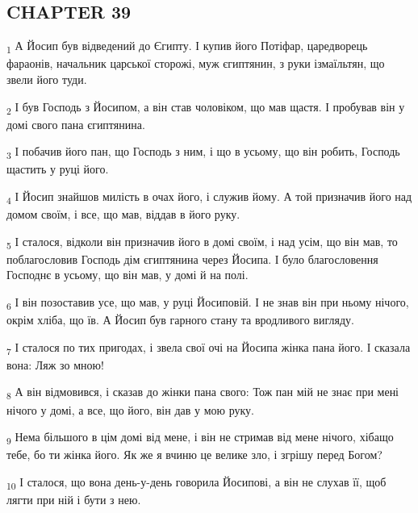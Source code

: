 \subsection{CHAPTER 39}
\begin{tcolorbox}
\textsubscript{1} А Йосип був відведений до Єгипту. І купив його Потіфар, царедворець фараонів, начальник царської сторожі, муж єгиптянин, з руки ізмаїльтян, що звели його туди.
\end{tcolorbox}
\begin{tcolorbox}
\textsubscript{2} І був Господь з Йосипом, а він став чоловіком, що мав щастя. І пробував він у домі свого пана єгиптянина.
\end{tcolorbox}
\begin{tcolorbox}
\textsubscript{3} І побачив його пан, що Господь з ним, і що в усьому, що він робить, Господь щастить у руці його.
\end{tcolorbox}
\begin{tcolorbox}
\textsubscript{4} І Йосип знайшов милість в очах його, і служив йому. А той призначив його над домом своїм, і все, що мав, віддав в його руку.
\end{tcolorbox}
\begin{tcolorbox}
\textsubscript{5} І сталося, відколи він призначив його в домі своїм, і над усім, що він мав, то поблагословив Господь дім єгиптянина через Йосипа. І було благословення Господнє в усьому, що він мав, у домі й на полі.
\end{tcolorbox}
\begin{tcolorbox}
\textsubscript{6} І він позоставив усе, що мав, у руці Йосиповій. І не знав він при ньому нічого, окрім хліба, що їв. А Йосип був гарного стану та вродливого вигляду.
\end{tcolorbox}
\begin{tcolorbox}
\textsubscript{7} І сталося по тих пригодах, і звела свої очі на Йосипа жінка пана його. І сказала вона: Ляж зо мною!
\end{tcolorbox}
\begin{tcolorbox}
\textsubscript{8} А він відмовився, і сказав до жінки пана свого: Тож пан мій не знає при мені нічого у домі, а все, що його, він дав у мою руку.
\end{tcolorbox}
\begin{tcolorbox}
\textsubscript{9} Нема більшого в цім домі від мене, і він не стримав від мене нічого, хібащо тебе, бо ти жінка його. Як же я вчиню це велике зло, і згрішу перед Богом?
\end{tcolorbox}
\begin{tcolorbox}
\textsubscript{10} І сталося, що вона день-у-день говорила Йосипові, а він не слухав її, щоб лягти при ній і бути з нею.
\end{tcolorbox}

